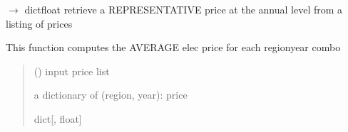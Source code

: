 \documentclass[letterpaper,10pt,english]{sphinxmanual}
\begin{document}
\begin{fulllineitems}
\label{\detokenize{src.integrator.utilities:src.integrator.utilities.poll_year_avg_elec_price}}
\pysigstartsignatures
\pysiglinewithargsret
{}
{}
{{ $\rightarrow$ dict\DUrole{p}{{[}}{\hyperref[\detokenize{src.integrator.utilities:src.integrator.utilities.HI}]{\sphinxcrossref{HI}}}float\DUrole{p}{{]}}}}
\pysigstopsignatures
\sphinxAtStartPar
retrieve a REPRESENTATIVE price at the annual level from a listing of prices

\sphinxAtStartPar
This function computes the AVERAGE elec price for each region\sphinxhyphen{}year combo
\begin{quote}\begin{description}
\sphinxAtStartPar
{} (\sphinxstyleliteralemphasis{\sphinxupquote{{[}}}\sphinxstyleliteralemphasis{\sphinxupquote{{[}}}{\hyperref[\detokenize{src.integrator.utilities:src.integrator.utilities.EI}]{\sphinxcrossref{\sphinxstyleliteralemphasis{\sphinxupquote{EI}}}}}\sphinxstyleliteralemphasis{\sphinxupquote{, }}\sphinxstyleliteralemphasis{\sphinxupquote{{]}}}\sphinxstyleliteralemphasis{\sphinxupquote{{]}}}) \textendash{} input price list

\sphinxAtStartPar
a dictionary of (region, year): price

\sphinxAtStartPar
dict{[}{\hyperref[\detokenize{src.integrator.utilities:src.integrator.utilities.HI}]{}}, float{]}

\end{description}\end{quote}

\end{fulllineitems}

\end{document}
